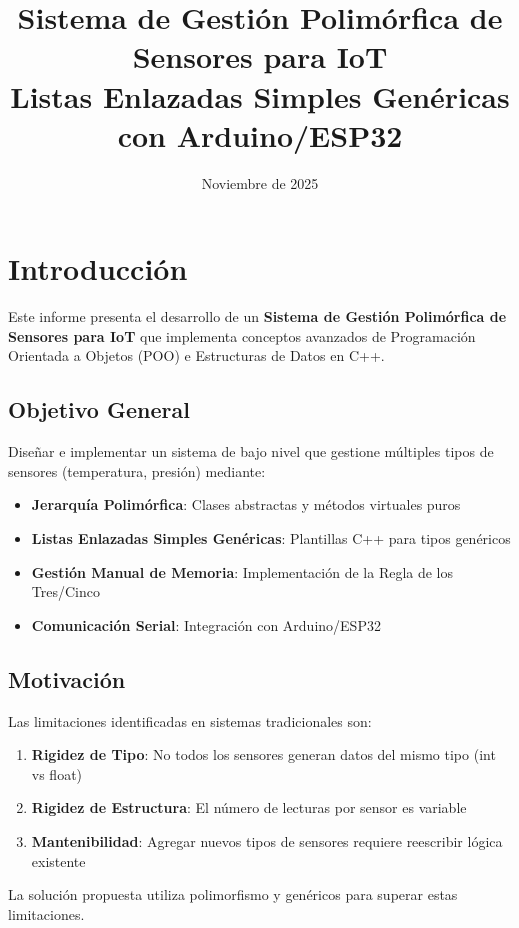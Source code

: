 \documentclass[12pt, spanish]{article}
\title{
    \textbf{Sistema de Gestión Polimórfica de Sensores para IoT} \\
    \vspace{1cm}
    \Large{Listas Enlazadas Simples Genéricas con Arduino/ESP32}
}
\author{}
\date{
    Noviembre de 2025
}
\newcommand{\secc}[1]{\section{#1}\vspace{0.3cm}}
\begin{document}
\maketitle

\newpage
\tableofcontents
\newpage

\secc{Introducción}

Este informe presenta el desarrollo de un \textbf{Sistema de Gestión Polimórfica de Sensores para IoT} que implementa conceptos avanzados de Programación Orientada a Objetos (POO) e Estructuras de Datos en C++.

\subsection{Objetivo General}

Diseñar e implementar un sistema de bajo nivel que gestione múltiples tipos de sensores (temperatura, presión) mediante:
\begin{itemize}
    \item \textbf{Jerarquía Polimórfica}: Clases abstractas y métodos virtuales puros
    \item \textbf{Listas Enlazadas Simples Genéricas}: Plantillas C++ para tipos genéricos
    \item \textbf{Gestión Manual de Memoria}: Implementación de la Regla de los Tres/Cinco
    \item \textbf{Comunicación Serial}: Integración con Arduino/ESP32
\end{itemize}

\subsection{Motivación}

Las limitaciones identificadas en sistemas tradicionales son:
\begin{enumerate}
    \item \textbf{Rigidez de Tipo}: No todos los sensores generan datos del mismo tipo (int vs float)
    \item \textbf{Rigidez de Estructura}: El número de lecturas por sensor es variable
    \item \textbf{Mantenibilidad}: Agregar nuevos tipos de sensores requiere reescribir lógica existente
\end{enumerate}

La solución propuesta utiliza polimorfismo y genéricos para superar estas limitaciones.
\end{document}
